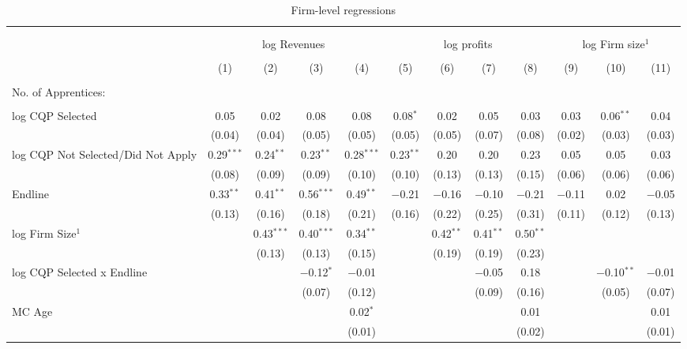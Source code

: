 \documentclass[
  11pt,
a4paper
]{article}
\begin{document}
\begin{table}[H] \centering 
  \caption{Firm-level regressions} 
  \label{tab:tbl-firmregs} 
\scriptsize 
\begin{tabular}{@{\extracolsep{-8pt}}lccccccccccc} 
\\[-1.8ex]\hline 
\hline \\[-1.8ex] 
\\[-1.8ex] & \multicolumn{4}{c}{log Revenues} & \multicolumn{4}{c}{log profits} & \multicolumn{3}{c}{log Firm size$^1$} \\ 
\\[-1.8ex] & (1) & (2) & (3) & (4) & (5) & (6) & (7) & (8) & (9) & (10) & (11)\\ 
\hline \\[-1.8ex] 
 No. of Apprentices: \\ \\
                               log CQP Selected & 0.05 & 0.02 & 0.08 & 0.08 & 0.08$^{*}$ & 0.02 & 0.05 & 0.03 & 0.03 & 0.06$^{**}$ & 0.04 \\ 
  & (0.04) & (0.04) & (0.05) & (0.05) & (0.05) & (0.05) & (0.07) & (0.08) & (0.02) & (0.03) & (0.03) \\ 
  log CQP Not Selected/Did Not Apply & 0.29$^{***}$ & 0.24$^{**}$ & 0.23$^{**}$ & 0.28$^{***}$ & 0.23$^{**}$ & 0.20 & 0.20 & 0.23 & 0.05 & 0.05 & 0.03 \\ 
  & (0.08) & (0.09) & (0.09) & (0.10) & (0.10) & (0.13) & (0.13) & (0.15) & (0.06) & (0.06) & (0.06) \\ 
  Endline & 0.33$^{**}$ & 0.41$^{**}$ & 0.56$^{***}$ & 0.49$^{**}$ & $-$0.21 & $-$0.16 & $-$0.10 & $-$0.21 & $-$0.11 & 0.02 & $-$0.05 \\ 
  & (0.13) & (0.16) & (0.18) & (0.21) & (0.16) & (0.22) & (0.25) & (0.31) & (0.11) & (0.12) & (0.13) \\ 
  log Firm Size$^1$ &  & 0.43$^{***}$ & 0.40$^{***}$ & 0.34$^{**}$ &  & 0.42$^{**}$ & 0.41$^{**}$ & 0.50$^{**}$ &  &  &  \\ 
  &  & (0.13) & (0.13) & (0.15) &  & (0.19) & (0.19) & (0.23) &  &  &  \\ 
  log CQP Selected x Endline &  &  & $-$0.12$^{*}$ & $-$0.01 &  &  & $-$0.05 & 0.18 &  & $-$0.10$^{**}$ & $-$0.01 \\ 
  &  &  & (0.07) & (0.12) &  &  & (0.09) & (0.16) &  & (0.05) & (0.07) \\ 
  MC Age &  &  &  & 0.02$^{*}$ &  &  &  & 0.01 &  &  & 0.01 \\ 
  &  &  &  & (0.01) &  &  &  & (0.02) &  &  & (0.01) \\ 

\end{tabular}
\end{table}
\end{document}
